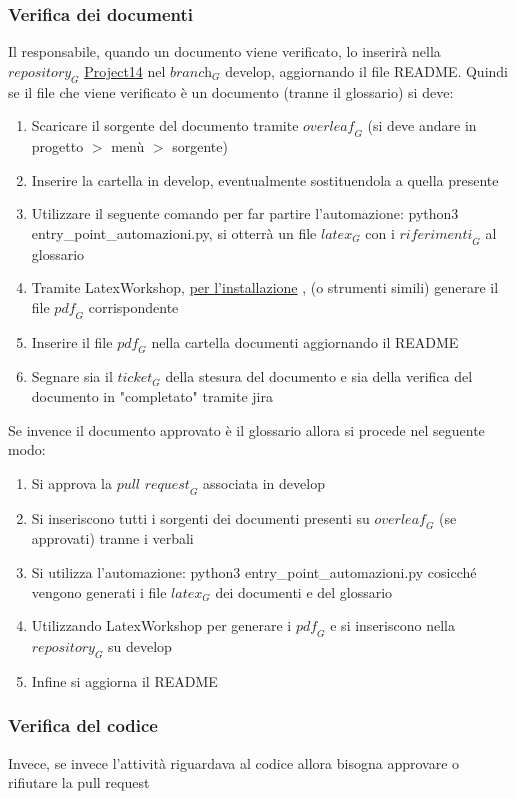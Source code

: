 \subsubsection{Verifica dei documenti}
Il responsabile, quando un documento viene verificato, lo inserirà nella $\textit{repository}_G$ \href{https://github.com/RAMtastic6/Project14}{Project14} nel $\textit{branch}_G$ develop, aggiornando il file README.
Quindi se il file che viene verificato è un documento (tranne il glossario) si deve:
\begin{enumerate}
    \item Scaricare il sorgente del documento tramite $\textit{overleaf}_G$ (si deve andare in progetto $>$ menù $>$ sorgente)
    \item Inserire la cartella in develop, eventualmente sostituendola a quella presente
    \item Utilizzare il seguente comando per far partire l'automazione: python3 entry\_point\_automazioni.py, si otterrà un file $\textit{latex}_G$ con i $\textit{riferimenti}_G$ al glossario
    \item Tramite LatexWorkshop, \href{https://github.com/James-Yu/LaTeX-Workshop/wiki/Install}{per l'installazione} , (o strumenti simili) generare il file $\textit{pdf}_G$ corrispondente
    \item Inserire il file $\textit{pdf}_G$ nella cartella documenti aggiornando il README
    \item Segnare sia il $\textit{ticket}_G$ della stesura del documento e sia della verifica del documento in "completato" tramite jira
\end{enumerate}
Se invence il documento approvato è il glossario allora si procede nel seguente modo:
\begin{enumerate}
    \item Si approva la $\textit{pull request}_G$ associata in develop
    \item Si inseriscono tutti i sorgenti dei documenti presenti su $\textit{overleaf}_G$ (se approvati) tranne i verbali
    \item Si utilizza l'automazione: python3 entry\_point\_automazioni.py
    cosicché vengono generati i file $\textit{latex}_G$ dei documenti e del glossario
    \item Utilizzando LatexWorkshop per generare i $\textit{pdf}_G$ e si inseriscono nella $\textit{repository}_G$ su develop
    \item Infine si aggiorna il README
\end{enumerate}
\subsubsection{Verifica del codice}
Invece, se invece l'attività riguardava al codice allora bisogna approvare o rifiutare la pull request

